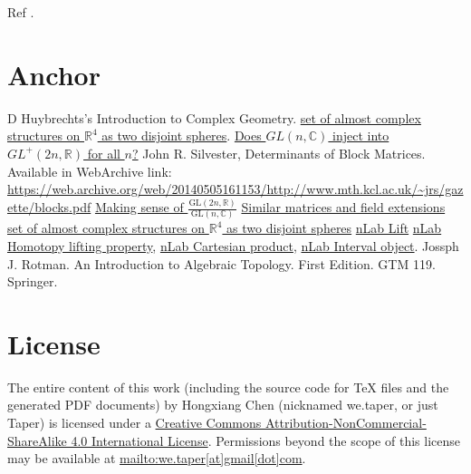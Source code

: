 \documentclass{article}
\numberwithin{equation}{subsection} %
\theoremstyle{definition}
\begin{document}
    Ref \cite{nlab-homotopy-lifting-property}.


\section{Anchor}
\label{sec:Anchor}

\begin{thebibliography}{1}
     D Huybrechts's Introduction to Complex Geometry.
     \href{http://math.stackexchange.com/questions/923957/set-of-almost-complex-structures-on-mathbb-r4-as-two-disjoint-spheres}{set of almost complex structures on $\mathbb{R}^4$ as two disjoint spheres}.
     \href{http://math.stackexchange.com/questions/1356823/does-gln-mathbbc-inject-into-gl2n-mathbbr-for-all-n}{Does $GL(n,\mathbb{C})$ inject into $GL^+(2n, \mathbb{R})$ for all $n$?}
     John R. Silvester, 
      Determinants of Block Matrices. Available in WebArchive link:
      \url{https://web.archive.org/web/20140505161153/http://www.mth.kcl.ac.uk/~jrs/gazette/blocks.pdf}
     \href{http://math.stackexchange.com/questions/1927487/making-sense-of-frac-mathrmgl2n-mathbbr-mathrmgln-mathbbc/1927518?noredirect=1#comment3957369_1927518}{Making sense of $\frac{\mathrm{GL}(2n,\mathbb{R})}{\mathrm{GL}(n,\mathbb{C})}$}
     \href{http://math.stackexchange.com/questions/57242/similar-matrices-and-field-extensions?noredirect=1&lq=1}
      {Similar matrices and field extensions}
     \href{http://math.stackexchange.com/questions/923957/set-of-almost-complex-structures-on-mathbb-r4-as-two-disjoint-spheres}{set of almost complex structures on $\mathbb{R}^4$ as two disjoint spheres}
    \href{https://ncatlab.org/nlab/show/lift}{nLab Lift}
    \href{https://ncatlab.org/nlab/show/homotopy+lifting+property}{nLab Homotopy lifting property}, \href{https://ncatlab.org/nlab/show/cartesian+product}{nLab Cartesian product}, \href{https://ncatlab.org/nlab/show/interval+object}{nLab Interval object}.
     Jossph J. Rotman. An Introduction to Algebraic
    Topology. First Edition. GTM 119. Springer.
\end{thebibliography}
\printnomenclature


\section{License}
The entire content of this work (including the source code
for TeX files and the generated PDF documents) by 
Hongxiang Chen (nicknamed we.taper, or just Taper) is
licensed under a 
\href{http://creativecommons.org/licenses/by-nc-sa/4.0/}{Creative 
Commons Attribution-NonCommercial-ShareAlike 4.0 International 
License}. Permissions beyond the scope of this 
license may be available at \url{mailto:we.taper[at]gmail[dot]com}.
\end{document}

